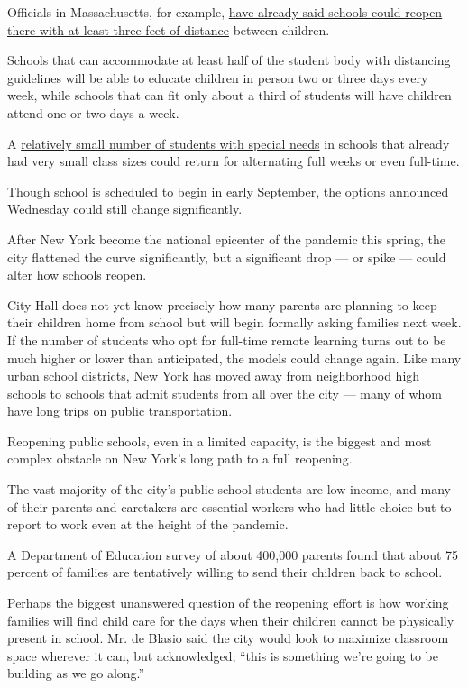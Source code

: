 Officials in Massachusetts, for example,
\href{https://www.npr.org/2020/07/02/886845449/massachusetts-education-commissioner-on-states-plan-to-reopen-schools-in-the-fal}{have
already said schools could reopen there with at least three feet of
distance} between children.

Schools that can accommodate at least half of the student body with
distancing guidelines will be able to educate children in person two or
three days every week, while schools that can fit only about a third of
students will have children attend one or two days a week.

A
\href{https://www.nytimes.com/2020/04/16/nyregion/special-education-coronavirus-nyc.html}{relatively
small number of students with special needs} in schools that already had
very small class sizes could return for alternating full weeks or even
full-time.

Though school is scheduled to begin in early September, the options
announced Wednesday could still change significantly.

After New York become the national epicenter of the pandemic this
spring, the city flattened the curve significantly, but a significant
drop --- or spike --- could alter how schools reopen.

City Hall does not yet know precisely how many parents are planning to
keep their children home from school but will begin formally asking
families next week. If the number of students who opt for full-time
remote learning turns out to be much higher or lower than anticipated,
the models could change again. Like many urban school districts, New
York has moved away from neighborhood high schools to schools that admit
students from all over the city --- many of whom have long trips on
public transportation.

Reopening public schools, even in a limited capacity, is the biggest and
most complex obstacle on New York's long path to a full reopening.

The vast majority of the city's public school students are low-income,
and many of their parents and caretakers are essential workers who had
little choice but to report to work even at the height of the pandemic.

A Department of Education survey of about 400,000 parents found that
about 75 percent of families are tentatively willing to send their
children back to school.

Perhaps the biggest unanswered question of the reopening effort is how
working families will find child care for the days when their children
cannot be physically present in school. Mr. de Blasio said the city
would look to maximize classroom space wherever it can, but
acknowledged, ``this is something we're going to be building as we go
along.''

